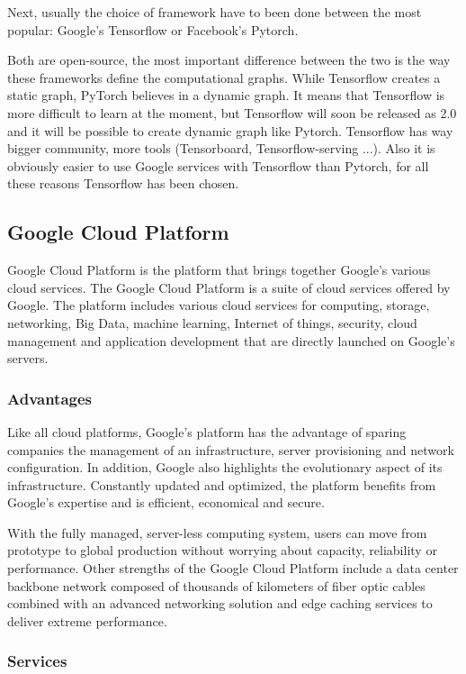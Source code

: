 Next, usually the choice of framework have to been done between the most popular: Google's Tensorflow\cite{tensorflow} or Facebook's Pytorch\cite{pytorch}.

Both are open-source, the most important difference between the two is the way these frameworks define the computational graphs. While Tensorflow creates a static graph, PyTorch believes in a dynamic graph.
It means that Tensorflow is more difficult to learn at the moment, but Tensorflow will soon be released as 2.0 and it will be possible to create dynamic graph like Pytorch.
Tensorflow has way bigger community, more tools (Tensorboard, Tensorflow-serving ...).
Also it is obviously easier to use Google services with Tensorflow than Pytorch, for all these reasons Tensorflow has been chosen.

\pagebreak\subsection{Google Cloud Platform}
Google Cloud Platform is the platform that brings together Google's various cloud services. 
The Google Cloud Platform is a suite of cloud services offered by Google. The platform includes various cloud services for computing, storage, networking, Big Data, machine learning, Internet of things, security, cloud management and application development that are directly launched on Google's servers.

\subsubsection{Advantages}

Like all cloud platforms, Google's platform has the advantage of sparing companies the management of an infrastructure, server provisioning and network configuration. In addition, Google also highlights the evolutionary aspect of its infrastructure. Constantly updated and optimized, the platform benefits from Google's expertise and is efficient, economical and secure.

With the fully managed, server-less computing system, users can move from prototype to global production without worrying about capacity, reliability or performance. Other strengths of the Google Cloud Platform include a data center backbone network composed of thousands of kilometers of fiber optic cables combined with an advanced networking solution and edge caching services to deliver extreme performance.

\subsubsection{Services}

